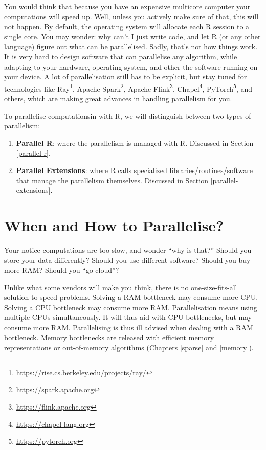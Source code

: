 \documentclass[]{book}
\providecommand{\tightlist}{%
  \setlength{\itemsep}{0pt}\setlength{\parskip}{0pt}}
\renewcommand{\href}[2]{#2\footnote{\url{#1}}}
\theoremstyle{definition}
\theoremstyle{definition}
\theoremstyle{definition}
\theoremstyle{remark}
\begin{document}
You would think that because you have an expensive multicore computer your computations will speed up.
Well, unless you actively make sure of that, this will not happen.
By default, the operating system will allocate each R session to a single core.
You may wonder: why can't I just write code, and let R (or any other language) figure out what can be parallelised.
Sadly, that's not how things work.
It is very hard to design software that can parallelise any algorithm, while adapting to your hardware, operating system, and other the software running on your device.
A lot of parallelisation still has to be explicit, but stay tuned for technologies like \href{https://rise.cs.berkeley.edu/projects/ray/}{Ray}, \href{https://spark.apache.org}{Apache Spark}, \href{https://flink.apache.org}{Apache Flink}, \href{https://chapel-lang.org}{Chapel}, \href{https://pytorch.org}{PyTorch}, and others, which are making great advances in handling parallelism for you.

To parallelise computationsin with R, we will distinguish between two types of parallelism:

\begin{enumerate}
\def\labelenumi{\arabic{enumi}.}
\tightlist
\item
  \textbf{Parallel R}: where the parallelism is managed with R. Discussed in Section \ref{parallel-r}.
\item
  \textbf{Parallel Extensions}: where R calls specialized libraries/routines/software that manage the parallelism themselves. Discussed in Section \ref{parallel-extensions}.
\end{enumerate}

\hypertarget{when-and-how-to-parallelise}{%
\section{When and How to Parallelise?}\label{when-and-how-to-parallelise}}

Your notice computations are too slow, and wonder ``why is that?''
Should you store your data differently?
Should you use different software?
Should you buy more RAM?
Should you ``go cloud''?

Unlike what some vendors will make you think, there is no one-size-fits-all solution to speed problems.
Solving a RAM bottleneck may consume more CPU.
Solving a CPU bottleneck may consume more RAM.
Parallelisation means using multiple CPUs simultaneously.
It will thus aid with CPU bottlenecks, but may consume more RAM.
Parallelising is thus ill advised when dealing with a RAM bottleneck.
Memory bottlenecks are released with efficient memory representations or out-of-memory algorithms (Chapters \ref{sparse} and \ref{memory}).
\end{document}
